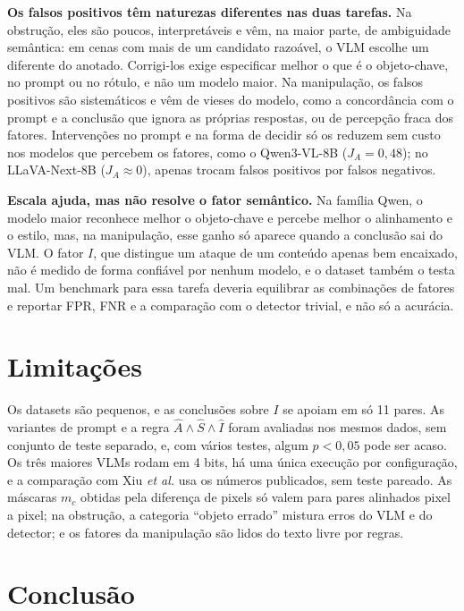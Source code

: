 \documentclass[conference]{IEEEtran}
\begin{document}
\textbf{Os falsos positivos têm naturezas diferentes nas duas tarefas.} Na obstrução, eles são poucos,
interpretáveis e vêm, na maior parte, de ambiguidade semântica: em cenas com mais de um candidato razoável, o VLM escolhe
um diferente do anotado. Corrigi-los exige especificar melhor o que é o objeto-chave, no prompt ou no
rótulo, e não um modelo maior. Na manipulação, os falsos positivos são sistemáticos e vêm de vieses do
modelo, como a concordância com o prompt e a conclusão que ignora as próprias respostas, ou de percepção
fraca dos fatores. Intervenções no prompt e na forma de decidir só os reduzem sem custo nos modelos que
percebem os fatores, como o Qwen3-VL-8B ($J_A=0{,}48$); no LLaVA-Next-8B ($J_A\approx 0$), apenas trocam
falsos positivos por falsos negativos.

\textbf{Escala ajuda, mas não resolve o fator semântico.} Na família Qwen, o modelo maior reconhece
melhor o objeto-chave e percebe melhor o alinhamento e o estilo, mas, na manipulação, esse ganho só
aparece quando a conclusão sai do VLM. O fator $I$, que distingue um ataque
de um conteúdo apenas bem encaixado, não é medido de forma confiável por nenhum modelo, e o dataset também
o testa mal. Um benchmark para essa tarefa deveria equilibrar as
combinações de fatores e reportar FPR, FNR e a comparação com o detector trivial, e não só a acurácia.

\section{Limitações}
\label{sec:lim}

Os datasets são pequenos, e as conclusões sobre $I$ se apoiam em só 11 pares. As variantes de prompt e a
regra $\hat A\wedge\hat S\wedge\hat I$ foram avaliadas nos mesmos dados, sem conjunto de teste separado,
e, com vários testes, algum $p<0{,}05$ pode ser acaso. Os três maiores VLMs rodam em 4 bits, há uma única
execução por configuração, e a comparação com Xiu \emph{et al.} usa os números publicados, sem teste
pareado. As máscaras $m_c$ obtidas pela diferença de pixels só valem para pares alinhados pixel a pixel;
na obstrução, a categoria ``objeto errado'' mistura erros do VLM e do detector; e os fatores da
manipulação são lidos do texto livre por regras.

\section{Conclusão}
\end{document}
